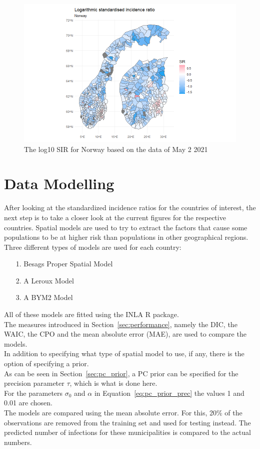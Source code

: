 \begin{figure}[H]
 \centering
 \includegraphics[width = 1.2\textwidth]{sir_norway_log.png}
 \caption{The log10 SIR for Norway based on the data of May 2 2021}
 \label{sirnorwaylog}
\end{figure}
\clearpage
\section{Data Modelling}
After looking at the standardized incidence ratios for the countries of interest, the next step is to take a closer look at the current figures for the respective countries. Spatial models are used to try to extract the factors that cause some populations to be at higher risk than populations in other geographical regions. Three different types of models are used for each country:
\begin{itemize}
  \item[1.] Besags Proper Spatial Model
  \item[2.] A Leroux Model
  \item[3.] A BYM2 Model
\end{itemize}
All of these models are fitted using the INLA \autocite[][]{rinla} R package. \\
The measures introduced in Section~\ref{sec:performance}, namely the DIC, the WAIC, the CPO and the mean absolute error (MAE), are used to compare the models.\\
In addition to specifying what type of spatial model to use, if any, there is the option of specifying a prior. \\
As can be seen in Section~\ref{sec:pc_prior}, a PC prior can be specified for the precision parameter $\tau$, which is what is done here. \\
For the parameters $\sigma_0$ and $\alpha$ in Equation~\ref{eq:pc_prior_prec} the values 1 and 0.01 are chosen. \\
The models are compared using the mean absolute error. For this, 20\% of the observations are removed from the training set and used for testing instead. The predicted number of infections for these municipalities is compared to the actual numbers.
